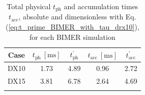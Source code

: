 \begin{table}[!h]
\centering
\caption{Total physical $t_\mathrm{ph}$ and accumulation times $t_\mathrm{acc}$, absolute and dimensionless with Eq. (\ref{eq:t_prime_BIMER_with_tau_drx10}), for each BIMER simulation}
\begin{tabular}{ccccc}
\thickhline
\textbf{Case} &  $t_\mathrm{ph}~[\mathrm{ms}]$ & $t_\mathrm{ph}^{\prime}$ & $t_\mathrm{acc}~[\mathrm{ms}]$ & $t_\mathrm{acc}^{\prime}$ \\
\hline
DX10 & 1.73 & 4.89 & 0.96 & 2.72 \\
DX15 & 3.81 & 6.78 & 2.64 &  4.69 \\
\thickhline
\end{tabular}
\label{tab:BIMER_SLI_t_prime_accumulation}
\end{table}




